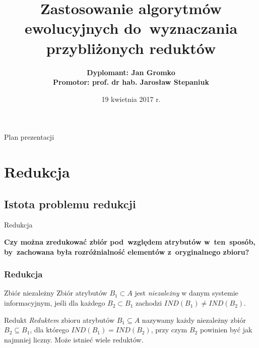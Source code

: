 \documentclass[10pt]{beamer}
\title[Zastosowanie algorytmów ewolucyjnych do wyznaczania przybliżonych reduktów] %
{ %
      \textbf{Zastosowanie algorytmów ewolucyjnych do~wyznaczania przybliżonych reduktów}
}
\author[Jan Gromko]
{
	\textbf{Dyplomant: Jan Gromko}\\
	\textbf{Promotor: prof. dr hab. Jarosław Stepaniuk}
}
\institute[WI PB]
{
      Wydział Informatyki Politechniki Białostockiej
}
\date{19 kwietnia 2017 r.}
\begin{document}
{\1%
\begin{frame}
\begin{spacing}{1.5}
  \titlepage
\end{spacing}
\end{frame}}


\begin{frame}{Plan prezentacji}{}
\tableofcontents
\end{frame}


\section{Redukcja}

\subsection{Istota problemu redukcji}
\begin{frame}{Redukcja}
\begin{spacing}{1.5}
\textbf{Czy można zredukować zbiór pod~względem atrybutów w~ten~sposób, by~zachowana była rozróżnialność elementów z~oryginalnego zbioru?}
\end{spacing}
\end{frame}

\begin{frame}
\frametitle{Redukcja}
\begin{spacing}{1.5}
\begin{block}{Zbiór niezależny}
Zbiór atrybutów $B_{1} \subset A$ jest \textit{niezależny} w danym systemie informacyjnym, jeśli dla każdego $B_{2} \subset B_{1}$ zachodzi $IND(B_{1}) \neq IND(B_{2})$.
\end{block}

\begin{block}{Redukt}
\textit{Reduktem} zbioru atrybutów $B_{1} \subseteq A$ nazywamy każdy niezależny zbiór $B_{2} \subseteq B_{1}$, dla którego $IND(B_{1}) = IND(B_{2})$, przy czym $B_{2}$ powinien być 
jak najmniej liczny. Może istnieć wiele reduktów.
\end{block}
\end{spacing}
\end{frame}
\end{document}
